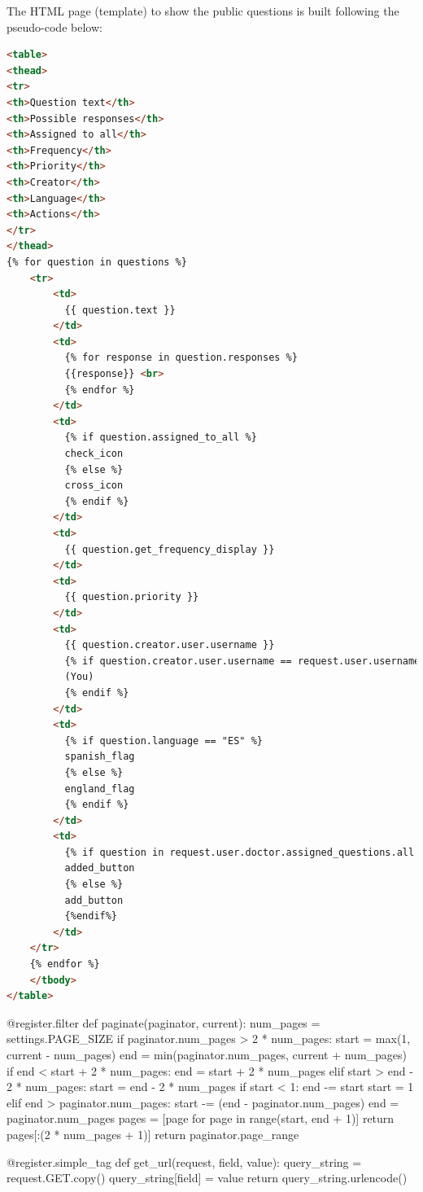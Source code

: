 \documentclass[12pt,english]{article}
\begin{document}
The HTML page (template) to show the public questions is built following the pseudo-code below:
\begin{lstlisting}[language=html, caption={Pseudo-code to generate public questions template page}, captionpos=b]
<table>
<thead>
<tr>
<th>Question text</th>
<th>Possible responses</th>
<th>Assigned to all</th>
<th>Frequency</th>
<th>Priority</th>
<th>Creator</th>
<th>Language</th>
<th>Actions</th>
</tr>
</thead>
{% for question in questions %}
    <tr>
        <td>
          {{ question.text }}
        </td>
        <td>
          {% for response in question.responses %}
          {{response}} <br>
          {% endfor %}
        </td>
        <td>
          {% if question.assigned_to_all %}
          check_icon
          {% else %}
          cross_icon
          {% endif %}
        </td>
        <td>
          {{ question.get_frequency_display }}
        </td>
        <td>
          {{ question.priority }}
        </td>
        <td>
          {{ question.creator.user.username }}
          {% if question.creator.user.username == request.user.username %}
          (You)
          {% endif %}
        </td>
        <td>
          {% if question.language == "ES" %}
          spanish_flag
          {% else %}
          england_flag
          {% endif %}
        </td>
        <td>
          {% if question in request.user.doctor.assigned_questions.all %}
          added_button
          {% else %}
          add_button
          {%endif%}
        </td>
    </tr>
    {% endfor %}
    </tbody>
</table>
\end{lstlisting}

\begin{python}[caption={Pagination code snippets. Retrieved from \href{https://medium.com/@sumitlni/paginate-properly-please-93e7ca776432}{https://medium.com/@sumitlni/paginate-properly-please-93e7ca776432}}, captionpos=b]
@register.filter
def paginate(paginator, current):
  num_pages = settings.PAGE_SIZE
  if paginator.num_pages > 2 * num_pages:
      start = max(1, current - num_pages)
      end = min(paginator.num_pages, current + num_pages)
      if end < start + 2 * num_pages:
          end = start + 2 * num_pages
      elif start > end - 2 * num_pages:
          start = end - 2 * num_pages
      if start < 1:
          end -= start
          start = 1
      elif end > paginator.num_pages:
          start -= (end - paginator.num_pages)
          end = paginator.num_pages
      pages = [page for page in range(start, end + 1)]
      return pages[:(2 * num_pages + 1)]
  return paginator.page_range

@register.simple_tag
def get_url(request, field, value):
    query_string = request.GET.copy()
    query_string[field] = value
    return query_string.urlencode()
\end{python}
\end{document}
